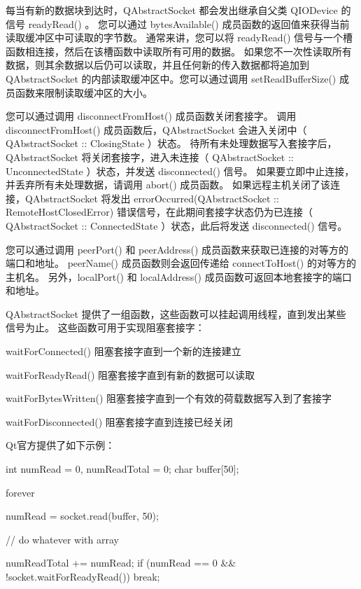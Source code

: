 每当有新的数据块到达时，QAbstractSocket 都会发出继承自父类 QIODevice 的信号 readyRead() 。 您可以通过 bytesAvailable() 成员函数的返回值来获得当前读取缓冲区中可读取的字节数。 通常来讲，您可以将 readyRead() 信号与一个槽函数相连接，然后在该槽函数中读取所有可用的数据。 如果您不一次性读取所有数据，则其余数据以后仍可以读取，并且任何新的传入数据都将追加到 QAbstractSocket 的内部读取缓冲区中。您可以通过调用 setReadBufferSize() 成员函数来限制读取缓冲区的大小。

您可以通过调用 disconnectFromHost() 成员函数关闭套接字。 调用 disconnectFromHost() 成员函数后，QAbstractSocket 会进入关闭中（ QAbstractSocket :: ClosingState ）状态。 待所有未处理数据写入套接字后，QAbstractSocket 将关闭套接字，进入未连接（ QAbstractSocket :: UnconnectedState ）状态，并发送 disconnected() 信号。 如果要立即中止连接，并丢弃所有未处理数据，请调用 abort() 成员函数。 如果远程主机关闭了该连接，QAbstractSocket 将发出 errorOccurred(QAbstractSocket :: RemoteHostClosedError) 错误信号，在此期间套接字状态仍为已连接（ QAbstractSocket :: ConnectedState ）状态，此后将发送 disconnected() 信号。

您可以通过调用 peerPort() 和 peerAddress() 成员函数来获取已连接的对等方的端口和地址。 peerName() 成员函数则会返回传递给 connectToHost() 的对等方的主机名。 另外，localPort() 和 localAddress() 成员函数可返回本地套接字的端口和地址。

QAbstractSocket 提供了一组函数，这些函数可以挂起调用线程，直到发出某些
信号为止。 这些函数可用于实现阻塞套接字：

\begin{compactitem}
\item waitForConnected() 阻塞套接字直到一个新的连接建立
\item waitForReadyRead() 阻塞套接字直到有新的数据可以读取
\item waitForBytesWritten() 阻塞套接字直到一个有效的荷载数据写入到了套接字
\item waitForDisconnected() 阻塞套接字直到连接已经关闭
\end{compactitem}



Qt官方提供了如下示例：

\begin{cppcode}
int numRead = 0, numReadTotal = 0;
char buffer[50];

forever {
	numRead  = socket.read(buffer, 50);

	// do whatever with array

	numReadTotal += numRead;
	if (numRead == 0 && !socket.waitForReadyRead())
		break;
}

\end{cppcode}


